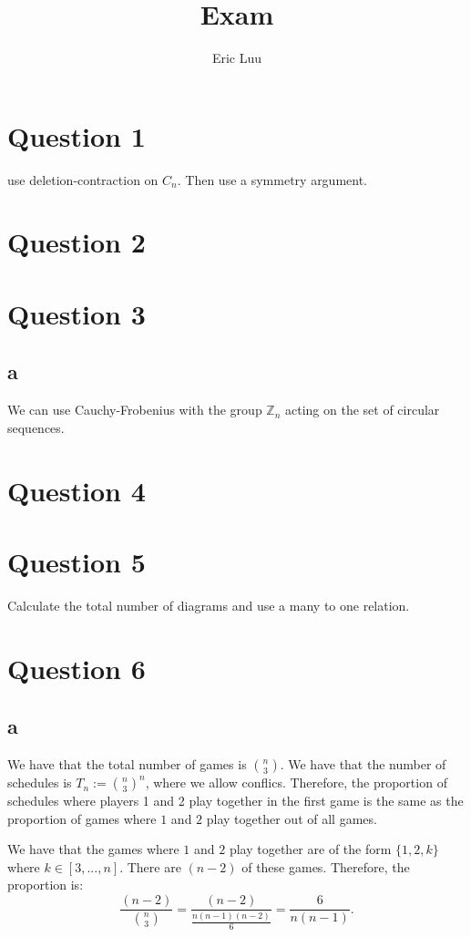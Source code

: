 \documentclass[]{article}
\title{Exam}
\author{Eric Luu}
\theoremstyle{definition}
\numberwithin{theorem}{section}
\numberwithin{equation}{section}
\begin{document}
\maketitle
\section{Question 1}
use deletion-contraction on $C_n$.
Then use a symmetry argument. 

\section{Question 2}

\section{Question 3}
\subsection{a}
We can use Cauchy-Frobenius with the group $\mathbb{Z}_n$ acting on the set of circular sequences.

\section{Question 4}

\section{Question 5}
Calculate the total number of diagrams and use a many to one relation.

\section{Question 6}

\subsection{a}
We have that the total number of games is $\binom{n}{3}$. We have that the number of schedules is $T_n := \binom{n}{3}^n$, where we allow conflics. Therefore, the proportion of schedules where players 1 and 2 play together in the first game is the same as the proportion of games where $1$ and $2$ play together out of all games. 

We have that the games where $1$ and $2$ play together are of the form $\{ 1, 2, k\}$ where $k \in [3, ..., n]$. There are $(n-2)$ of these games.
Therefore, the proportion is:
\begin{equation}
	\frac{(n-2)}{\binom{n}{3}} = \frac{(n-2)}{\frac{n(n-1)(n-2)}{6}} = \frac{6}{n(n-1)}.
\end{equation}
\end{document}

